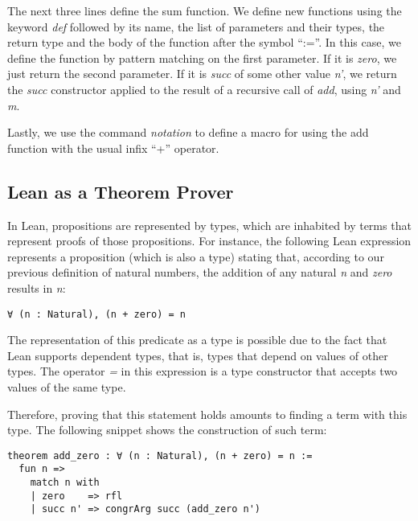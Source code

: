 The next three lines define the sum function. We define new functions using the keyword \textit{def} followed by its name, the list of parameters and their types, the return type and the body of the function after the symbol ``:=''. In this case, we define the function by pattern matching on the first parameter. If it is \textit{zero}, we just return the second parameter. If it is \textit{succ} of some other value \textit{n'}, we return the \textit{succ} constructor applied to the result of a recursive call of \textit{add}, using \textit{n'} and \textit{m}.

Lastly, we use the command \textit{notation} to define a macro for using the add function with the usual infix ``+'' operator.



\subsection{Lean as a Theorem Prover}

In Lean, propositions are represented by types, which are inhabited by terms that represent proofs of those propositions. For instance, the following Lean expression represents a proposition (which is also a type) stating that, according to our previous definition of natural numbers, the addition of any natural \textit{n} and \textit{zero} results in \textit{n}:

\begin{verbatim}
∀ (n : Natural), (n + zero) = n
\end{verbatim}

The representation of this predicate as a type is possible due to the fact that Lean supports dependent types, that is, types that depend on values of other types. The operator \textit{=} in this expression is a type constructor that accepts two values of the same type.

Therefore, proving that this statement holds amounts to finding a term with this type. The following snippet shows the construction of such term:

\begin{verbatim}
theorem add_zero : ∀ (n : Natural), (n + zero) = n :=
  fun n =>
    match n with
    | zero    => rfl
    | succ n' => congrArg succ (add_zero n')
\end{verbatim}


